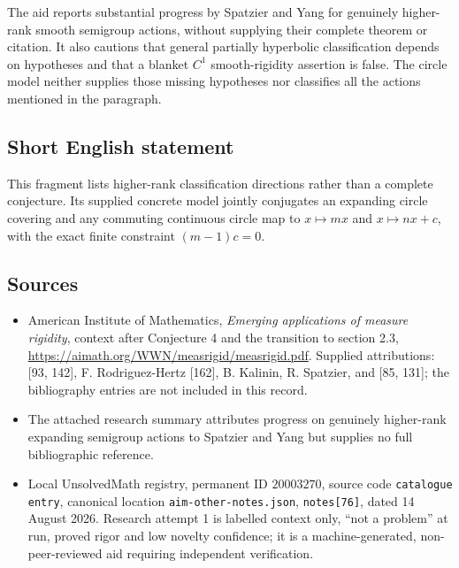 \documentclass[11pt]{article}
\begin{document}
The aid reports substantial progress by Spatzier and Yang for genuinely higher-rank smooth semigroup actions, without supplying their complete theorem or citation. It also cautions that general partially hyperbolic classification depends on hypotheses and that a blanket $C^1$ smooth-rigidity assertion is false. The circle model neither supplies those missing hypotheses nor classifies all the actions mentioned in the paragraph.
\subsection{Short English statement}
This fragment lists higher-rank classification directions rather than a complete conjecture. Its supplied concrete model jointly conjugates an expanding circle covering and any commuting continuous circle map to $x\mapsto mx$ and $x\mapsto nx+c$, with the exact finite constraint $(m-1)c=0$.
\subsection{Sources}
\begin{itemize}
\item American Institute of Mathematics, \emph{Emerging applications of measure rigidity}, context after Conjecture 4 and the transition to section 2.3, \url{https://aimath.org/WWN/measrigid/measrigid.pdf}. Supplied attributions: [93, 142], F. Rodriguez-Hertz [162], B. Kalinin, R. Spatzier, and [85, 131]; the bibliography entries are not included in this record.
\item The attached research summary attributes progress on genuinely higher-rank expanding semigroup actions to Spatzier and Yang but supplies no full bibliographic reference.
\item Local UnsolvedMath registry, permanent ID $20003270$, source code \texttt{catalogue entry}, canonical location \texttt{aim-other-notes.json}, \texttt{notes[76]}, dated 14 August 2026. Research attempt 1 is labelled context only, ``not a problem'' at run, proved rigor and low novelty confidence; it is a machine-generated, non-peer-reviewed aid requiring independent verification.
\end{itemize}
\end{document}
